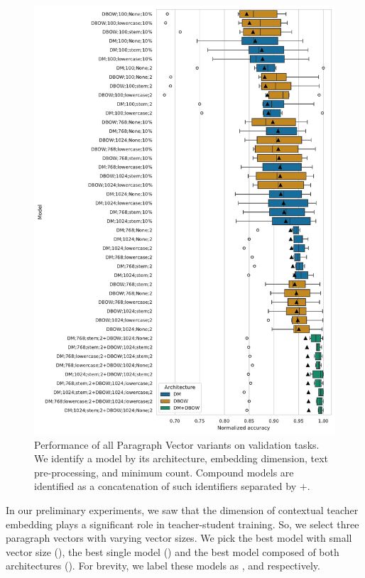 \begin{figure}

    \includegraphics[width=\textwidth]{./img/pv_val_scores.pdf}

    \caption{Performance of all Paragraph Vector variants on validation tasks.
    We identify a model by its architecture, embedding dimension, text
    pre-processing, and minimum count. Compound models are identified as a
    concatenation of such identifiers separated by $+$.}

    \label{fig:pv_val_scores}

\end{figure}

In our preliminary experiments, we saw that the dimension of contextual teacher
embedding plays a significant role in teacher-student training. So, we select
three paragraph vectors with varying vector sizes. We pick the best model with
small vector size (), the best single model
() and the best model composed of both architectures
(). For brevity, we label these models as
,  and  respectively.

